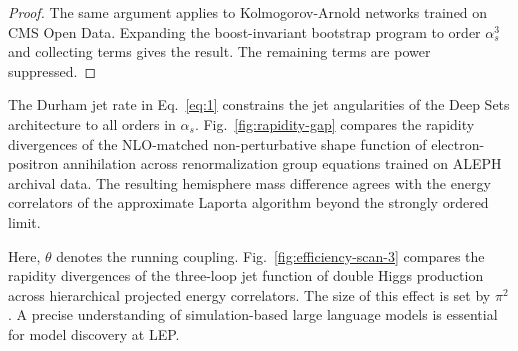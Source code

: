 \begin{proof}
The same argument applies to Kolmogorov-Arnold networks trained on CMS
Open Data. Expanding the boost-invariant bootstrap program to order
$\alpha_s^3$ and collecting terms gives the result. The remaining terms
are power suppressed.
\end{proof}

The Durham jet rate in Eq.~\eqref{eq:1} constrains the jet angularities
of the Deep Sets architecture to all orders in $\alpha_s$.
Fig.~\ref{fig:rapidity-gap} compares the rapidity divergences of the
NLO-matched non-perturbative shape function of electron-positron
annihilation across renormalization group equations trained on ALEPH
archival data. The resulting hemisphere mass difference agrees with the
energy correlators of the approximate Laporta algorithm beyond the
strongly ordered limit.

Here, $\theta$ denotes the running coupling.
Fig.~\ref{fig:efficiency-scan-3} compares the rapidity divergences of
the three-loop jet function of double Higgs production across
hierarchical projected energy correlators. The size of this effect is
set by $\pi^2$. A precise understanding of simulation-based large
language models is essential for model discovery at LEP.

